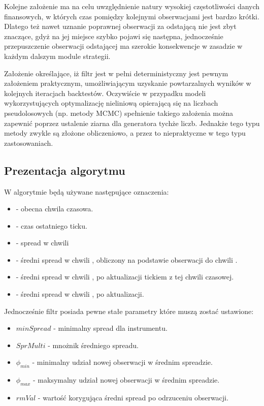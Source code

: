 \documentclass[a4paper,12pt,openany, DIV=calc, headsepline]{scrbook}
\begin{document}
Kolejne założenie ma na celu uwzględnienie natury wysokiej częstotliwości danych finansowych, w których czas pomiędzy kolejnymi obserwacjami jest bardzo krótki. Dlatego też nawet  uznanie poprawnej obserwacji za odstającą nie jest zbyt znaczące, gdyż na jej miejsce szybko pojawi się następna, jednocześnie przepuszczenie obserwacji odstającej ma szerokie konsekwencje w zasadzie w każdym dalszym module strategii.

Założenie określające, iż filtr jest w pełni deterministyczny jest pewnym założeniem praktycznym, umożliwiającym uzyskanie powtarzalnych wyników w kolejnych iteracjach backtestów. Oczywiście w przypadku modeli wykorzystujących optymalizację nieliniową opierającą się na liczbach pseudolosowych (np. metody MCMC) spełnienie takiego założenia można zapewnić poprzez ustalenie ziarna dla generatora tychże liczb. Jednakże tego typu metody zwykle są złożone obliczeniowo, a przez to niepraktyczne w tego typu zastosowaniach.  




\subsection{Prezentacja algorytmu}

W algorytmie będą używane następujące oznaczenia:

\begin{itemize}
\item \ts - obecna chwila czasowa.
\item \tsl - czas ostatniego ticku.
\item \Spt  - spread w chwili \ts
\item \MSpc - średni spread w chwili \ts, obliczony na podstawie obserwacji do chwili \tsl.
\item \MSpn - średni spread w chwili \ts, po aktualizacji tickiem z tej chwili czasowej.
\item \MSpo - średni spread w chwili \tsl, po aktualizacji.
\end{itemize}

Jednocześnie filtr posiada pewne stałe parametry które muszą zostać ustawione:

\begin{itemize}
\item $minSpread$ - minimalny spread dla instrumentu.
\item $SprMulti$ - mnożnik średniego spreadu.
\item $\phi_{min}$ - minimalny udział nowej obserwacji w średnim spreadzie.
\item $\phi_{max}$ - maksymalny udział nowej obserwacji w średnim spreadzie.
\item $rmVal$ - wartość korygująca średni spread po odrzuceniu obserwacji.
\end{itemize}
\end{document}
